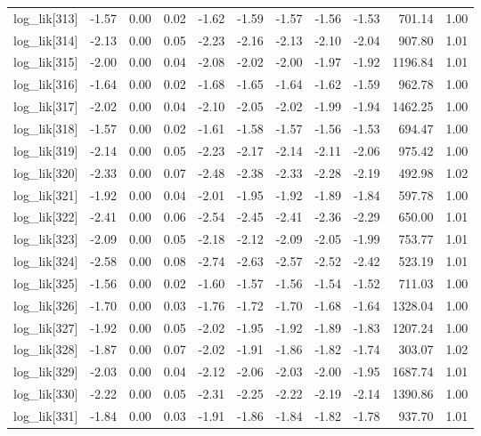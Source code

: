 \begin{table}[ht]
\begin{tabular}{rrrrrrrrrrr}
  log\_lik[313] & -1.57 & 0.00 & 0.02 & -1.62 & -1.59 & -1.57 & -1.56 & -1.53 & 701.14 & 1.00 \\ 
  log\_lik[314] & -2.13 & 0.00 & 0.05 & -2.23 & -2.16 & -2.13 & -2.10 & -2.04 & 907.80 & 1.01 \\ 
  log\_lik[315] & -2.00 & 0.00 & 0.04 & -2.08 & -2.02 & -2.00 & -1.97 & -1.92 & 1196.84 & 1.01 \\ 
  log\_lik[316] & -1.64 & 0.00 & 0.02 & -1.68 & -1.65 & -1.64 & -1.62 & -1.59 & 962.78 & 1.00 \\ 
  log\_lik[317] & -2.02 & 0.00 & 0.04 & -2.10 & -2.05 & -2.02 & -1.99 & -1.94 & 1462.25 & 1.00 \\ 
  log\_lik[318] & -1.57 & 0.00 & 0.02 & -1.61 & -1.58 & -1.57 & -1.56 & -1.53 & 694.47 & 1.00 \\ 
  log\_lik[319] & -2.14 & 0.00 & 0.05 & -2.23 & -2.17 & -2.14 & -2.11 & -2.06 & 975.42 & 1.00 \\ 
  log\_lik[320] & -2.33 & 0.00 & 0.07 & -2.48 & -2.38 & -2.33 & -2.28 & -2.19 & 492.98 & 1.02 \\ 
  log\_lik[321] & -1.92 & 0.00 & 0.04 & -2.01 & -1.95 & -1.92 & -1.89 & -1.84 & 597.78 & 1.00 \\ 
  log\_lik[322] & -2.41 & 0.00 & 0.06 & -2.54 & -2.45 & -2.41 & -2.36 & -2.29 & 650.00 & 1.01 \\ 
  log\_lik[323] & -2.09 & 0.00 & 0.05 & -2.18 & -2.12 & -2.09 & -2.05 & -1.99 & 753.77 & 1.01 \\ 
  log\_lik[324] & -2.58 & 0.00 & 0.08 & -2.74 & -2.63 & -2.57 & -2.52 & -2.42 & 523.19 & 1.01 \\ 
  log\_lik[325] & -1.56 & 0.00 & 0.02 & -1.60 & -1.57 & -1.56 & -1.54 & -1.52 & 711.03 & 1.00 \\ 
  log\_lik[326] & -1.70 & 0.00 & 0.03 & -1.76 & -1.72 & -1.70 & -1.68 & -1.64 & 1328.04 & 1.00 \\ 
  log\_lik[327] & -1.92 & 0.00 & 0.05 & -2.02 & -1.95 & -1.92 & -1.89 & -1.83 & 1207.24 & 1.00 \\ 
  log\_lik[328] & -1.87 & 0.00 & 0.07 & -2.02 & -1.91 & -1.86 & -1.82 & -1.74 & 303.07 & 1.02 \\ 
  log\_lik[329] & -2.03 & 0.00 & 0.04 & -2.12 & -2.06 & -2.03 & -2.00 & -1.95 & 1687.74 & 1.01 \\ 
  log\_lik[330] & -2.22 & 0.00 & 0.05 & -2.31 & -2.25 & -2.22 & -2.19 & -2.14 & 1390.86 & 1.00 \\ 
  log\_lik[331] & -1.84 & 0.00 & 0.03 & -1.91 & -1.86 & -1.84 & -1.82 & -1.78 & 937.70 & 1.01 \\ 

\end{tabular}
\end{table}
